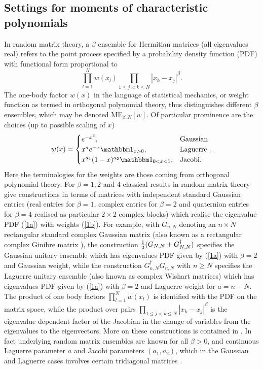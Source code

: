 \documentclass[11pt,a4paper]{article}
\numberwithin{equation}{section} %
\theoremstyle{plain}
\theoremstyle{definition}
\numberwithin{prop}{section}
\numberwithin{cor}{section}
\numberwithin{remark}{section}
\begin{document}
\subsection{Settings for moments of characteristic polynomials}
In random matrix theory, a $\beta$ ensemble for Hermitian matrices (all eigenvalues real) refers to the point process
specified by a probability density function (PDF) with  functional form proportional to
\begin{equation}\label{1a}
\prod_{l=1}^N w(x_l) \prod_{1 \le j < k \le N} |x_k - x_j|^\beta.
\end{equation}
The one-body factor $w(x)$ in the language of statistical mechanics, or weight function as termed in orthogonal polynomial theory, 
thus distinguishes different $\beta$ ensembles, which may be denoted ME${}_{\beta,N}[w]$.
Of particular prominence are the choices (up to possible scaling of $x$)
\begin{equation}\label{1b}
w(x) = \begin{cases} e^{-x^2}, & {\rm Gaussian} \\
x^a e^{-x} \mathbbm 1_{x > 0} ,& {\rm Laguerre} \\
x^{a_1} (1 - x)^{a_2}  \mathbbm 1_{0 < x < 1},  & {\rm Jacobi}. \end{cases},
\end{equation}
Here the terminologies for the weights are those coming from orthogonal polynomial theory. For $\beta = 1,2$ and 4 classical results in random
matrix theory give constructions in terms of matrices with independent standard Gaussian entries (real entries for $\beta = 1$,
complex entries for $\beta = 2$ and quaternion entries for $\beta = 4$ realised as particular $2 \times 2$ complex blocks) which realise the eigenvalue
PDF (\ref{1a}) with weights (\ref{1b}). For example, with $G_{n,N}$ denoting an $n \times N$ rectangular standard complex Gaussian matrix
(also known as a rectangular complex Ginibre matrix \cite{BF24}), the construction ${1 \over 2} (G_{N,N} + G_{N,N} ^\dagger)$ specifies
the Gaussian unitary ensemble  which has eigenvalues PDF given by (\ref{1a}) with $\beta = 2$ and Gaussian weight, while the construction
$G_{n,N}^\dagger G_{n,N}$ with $n \ge N$ specifies the Laguerre unitary ensemble (also known as complex Wishart matrices) 
which has eigenvalues PDF given by (\ref{1a}) with $\beta = 2$ and Laguerre weight for $a = n - N$. The product of one body factors $\prod_{l=1}^N w(x_l)$
is identified with the PDF on the matrix space, while the product over pairs $ \prod_{1 \le j < k \le N} |x_k - x_j|^\beta$ is the eigenvalue dependent factor of the
Jacobian in the change of variables from the eigenvalues to the eigenvectors.
More on these constructions
 is contained in \cite[Ch.~1 and 3]{Fo10}. In fact underlying random matrix ensembles are known for all $\beta > 0$, and continuous
Laguerre parameter $a$ and Jacobi parameters $(a_1, a_2)$, which in the Gaussian and Laguerre cases involves certain tridiagonal
matrices \cite{DE02}.
\end{document}
